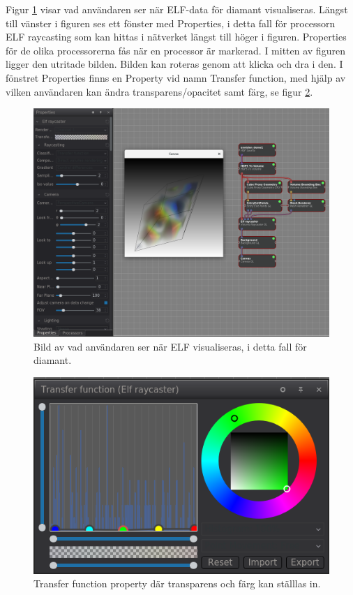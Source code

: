 \documentclass[a4paper,12pt]{article}
\begin{document}
Figur \ref{fig:interface} visar vad användaren ser när ELF-data för diamant visualiseras. Längst till vänster i figuren ses ett fönster med Properties, i detta fall för processorn ELF raycasting som kan hittas i nätverket längst till höger i figuren. Properties för de olika processorerna fås när en processor är markerad. I mitten av figuren ligger den utritade bilden. Bilden kan roteras genom att klicka och dra i den. I fönstret Properties finns en Property vid namn Transfer function, med hjälp av vilken användaren kan ändra transparens/opacitet samt färg, se figur \ref{fig:transferfunction}.

\begin{figure}[H]
	\centering
	\includegraphics[scale=0.3]{inviwo_interface_elf.png}
	\caption{Bild av vad användaren ser när ELF visualiseras, i detta fall för diamant.}
	\label{fig:interface}
\end{figure}

\begin{figure}[H]
	\centering
	\includegraphics[scale=0.55]{transferfunction_elf.png}
	\caption{Transfer function property där transparens och färg kan ställlas in.}
	\label{fig:transferfunction}
\end{figure}
\end{document}
